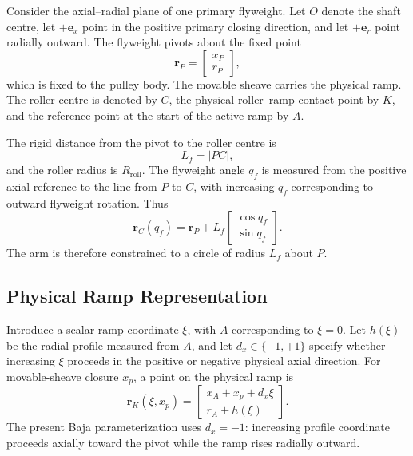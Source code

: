 \documentclass[11pt]{report}
\numberwithin{equation}{section}
\begin{document}
Consider the axial--radial plane of one primary flyweight. Let \(O\) denote the
shaft centre, let \(+\bm e_x\) point in the positive primary closing direction,
and let \(+\bm e_r\) point radially outward. The flyweight pivots about the
fixed point
\begin{equation}
    \bm r_P
    =
    \begin{bmatrix}
        x_P\\
        r_P
    \end{bmatrix},
\end{equation}
which is fixed to the pulley body. The movable sheave carries the physical ramp.
The roller centre is denoted by \(C\), the physical roller--ramp contact point
by \(K\), and the reference point at the start of the active ramp by \(A\).

The rigid distance from the pivot to the roller centre is
\begin{equation}
    \boxed{L_f=|PC|},
    \label{eq:appB_arm_length}
\end{equation}
and the roller radius is \(R_{\mathrm{roll}}\). The flyweight angle \(q_f\) is
measured from the positive axial reference to the line from \(P\) to \(C\),
with increasing \(q_f\) corresponding to outward flyweight rotation. Thus
\begin{equation}
    \bm r_C(q_f)
    =
    \bm r_P
    +
    L_f
    \begin{bmatrix}
        \cos q_f\\
        \sin q_f
    \end{bmatrix}.
    \label{eq:appB_roller_center_from_q}
\end{equation}
The arm is therefore constrained to a circle of radius \(L_f\) about \(P\).

\subsection{Physical Ramp Representation}
\label{app:flyweight_general_ramp}

Introduce a scalar ramp coordinate \(\xi\), with \(A\) corresponding to
\(\xi=0\). Let \(h(\xi)\) be the radial profile measured from \(A\), and let
\(d_x\in\{-1,+1\}\) specify whether increasing \(\xi\) proceeds in the positive
or negative physical axial direction. For movable-sheave closure \(x_p\), a
point on the physical ramp is
\begin{equation}
    \boxed{
    \bm r_K(\xi,x_p)
    =
    \begin{bmatrix}
        x_A+x_p+d_x\xi\\[2mm]
        r_A+h(\xi)
    \end{bmatrix}.
    }
    \label{eq:appB_ramp_global}
\end{equation}
The present Baja parameterization uses \(d_x=-1\): increasing profile
coordinate proceeds axially toward the pivot while the ramp rises radially
outward.
\end{document}
